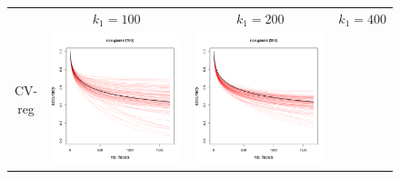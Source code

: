 \documentclass[twoside,11pt]{article}
\newenvironment{myfont}{\fontfamily{phv}\selectfont}{\par}
\begin{document}
\begin{figure}
\centering
\begin{tabular}{cccc}
&
\begin{myfont}$k_1 = 100$\end{myfont} & 
\begin{myfont}$k_1 = 200$\end{myfont} &
\begin{myfont}$k_1 = 400$\end{myfont}\\
\begin{myfont}CV-reg\end{myfont} & 
\includegraphics[scale = 0.2, clip = true, trim = 0 0 0 0.6in, valign=c]{repeat_100_r_cv_gauss.pdf} &
\includegraphics[scale = 0.2, clip = true, trim = 0 0 0 0.6in, valign=c]{repeat_200_r_cv_gauss.pdf} &

\end{tabular}
\end{figure}
\end{document}

